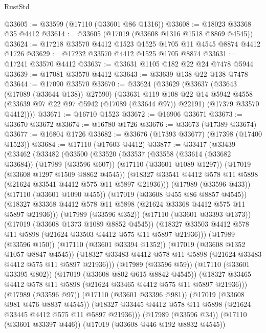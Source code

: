 \begin{lexlean}{RustStd}
\begin{coremodule}
@33605 := @33599 (@17110 (@33601 @86 @1316))
@33608 := @18023 @33368 @35 @4412
@33614 := @33605 (@17019 (@33608 @1316 @1518 @8869 @4545))
@33624 := @17218 @33570 @4412 @1523 @1525 @1705 @11 @4545 @8874 @4412 @1726
@33629 := @17232 @33570 @4412 @1525 @1705 @8874
@33631 := @17241 @33570 @4412
@33637 := @33631 @1105 @182 @22 @24 @7478 @5944
@33639 := @17081 @33570 @4412
@33643 := @33639 @138 @22 @138 @7478
@33644 := @17090 @33570
@33670 := @33624
    (@33629
      (@33637
        (@33643 (@17089 (@33644 @138)) @27590)
        (@33631
          @119
          @108
          @22
          @14
          @5942
          @4558
          (@33639 @97 @22 @97 @5942 (@17089 (@33644 @97)) @22191)
          (@17379 @33570 @4412))))
@33671 := @16710 @1523
@33672 := @16906 @33671
@33673 := @33670 @33672
@33674 := @16780 @1726
@33676 := @33673 (@17389 @33674)
@33677 := @16804 @1726
@33682 := @33676 (@17393 @33677) (@17398 (@17400 @1523))
@33684 := @17110 (@17603 @4412)
@33877 := @33417
    (@33439
      (@33462
        (@33482
          (@33500
            (@33520
              (@33537
                (@33558
                  (@33614 (@33682 @33684))
                  (@17989 (@33596 @607))
                  (@17110 (@33601 @1089 @1297))
                  (@17019 (@33608 @1297 @1509 @8862 @4545))
                  (@18327 @33541 @4412 @578 @11 @5898 (@21624 @33541 @4412 @575 @11 @5897 @21936)))
                (@17989 (@33596 @433))
                (@17110 (@33601 @1090 @455))
                (@17019 (@33608 @455 @86 @8857 @4545))
                (@18327 @33368 @4412 @578 @11 @5898 (@21624 @33368 @4412 @575 @11 @5897 @21936)))
              (@17989 (@33596 @352))
              (@17110 (@33601 @33393 @1373))
              (@17019 (@33608 @1373 @1089 @8852 @4545))
              (@18327 @33503 @4412 @578 @11 @5898 (@21624 @33503 @4412 @575 @11 @5897 @21936)))
            (@17989 (@33596 @150))
            (@17110 (@33601 @33394 @1352))
            (@17019 (@33608 @1352 @1057 @8847 @4545))
            (@18327 @33483 @4412 @578 @11 @5898 (@21624 @33483 @4412 @575 @11 @5897 @21936)))
          (@17989 (@33596 @59))
          (@17110 (@33601 @33395 @802))
          (@17019 (@33608 @802 @615 @8842 @4545))
          (@18327 @33465 @4412 @578 @11 @5898 (@21624 @33465 @4412 @575 @11 @5897 @21936)))
        (@17989 (@33596 @97))
        (@17110 (@33601 @33396 @981))
        (@17019 (@33608 @981 @476 @8837 @4545))
        (@18327 @33445 @4412 @578 @11 @5898 (@21624 @33445 @4412 @575 @11 @5897 @21936)))
      (@17989 (@33596 @34))
      (@17110 (@33601 @33397 @446))
      (@17019 (@33608 @446 @192 @8832 @4545))

\end{coremodule}
\end{lexlean}
